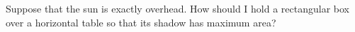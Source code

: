 Suppose that the sun is exactly overhead. How should I hold a rectangular box over a horizontal table so that its shadow has maximum area?
